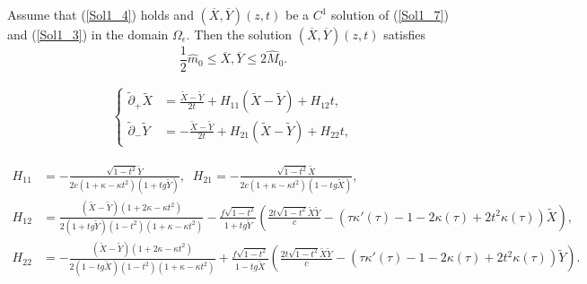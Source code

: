 \documentclass[10pt,a4paper]{amsart}
\begin{document}
\begin{lemma}\label{Sol_3_l1}
     Assume that (\ref{Sol1_4}) holds and $(\overline{X},\overline{ Y})(z,t)$ be a $C^1$ solution of (\ref{Sol1_7}) and (\ref{Sol1_3}) in the domain $\Omega_\epsilon$. Then the solution $(\overline{X},\overline{ Y})(z,t)$ satisfies
     \begin{equation}\label{l11}
       \frac{1}{2}\hat{m}_0 \leq \overline{X}, \overline{Y} \leq 2\hat{M}_0.
     \end{equation}
\end{lemma}

\begin{equation}\label{Sol3_5}
    \begin{split}
        \begin{cases}
          \tilde\partial_+\widetilde X &= \frac{\widetilde X-\widetilde Y}{2t}+H_{11}(\widetilde X-\widetilde Y)+H_{12}t,\\
          \tilde\partial_-\widetilde Y &= -\frac{\widetilde X-\widetilde Y}{2t}+H_{21}(\widetilde X-\widetilde Y)+H_{22}t,
        \end{cases}
    \end{split}
\end{equation}

\begin{equation}\label{Sol3_6}
    \begin{split}
        H_{11}&= -\frac{\sqrt{1-t^2}\widetilde Y}{2c(1+\kappa-\kappa t^2)(1+tg\widetilde Y)},\;\; H_{21}= -\frac{\sqrt{1-t^2}\widetilde X}{2c(1+\kappa-\kappa t^2)(1-tg\widetilde X)},\\
        H_{12} &=\frac{(\widetilde X-\widetilde Y)(1+2\kappa-\kappa t^2)}{2(1+tg\widetilde Y)(1-t^2)(1+\kappa-\kappa t^2)}-\frac{f\sqrt{1-t^2}}{1+tg\widetilde Y}\left(\frac{2t\sqrt{1-t^2}\widetilde X\widetilde Y}{c}-\left(\tau\kappa'(\tau)-1-2\kappa(\tau)+2t^2\kappa(\tau)\right)\widetilde X \right),\\
        H_{22} &=-\frac{(\widetilde X-\widetilde Y)(1+2\kappa-\kappa t^2)}{2(1-tg\widetilde X)(1-t^2)(1+\kappa-\kappa t^2)}+\frac{f\sqrt{1-t^2}}{1-tg\widetilde X}\left(\frac{2t\sqrt{1-t^2}\widetilde X\widetilde Y}{c}-\left(\tau\kappa'(\tau)-1-2\kappa(\tau)+2t^2\kappa(\tau)\right)\widetilde Y \right).
    \end{split}
\end{equation}
\end{document}
